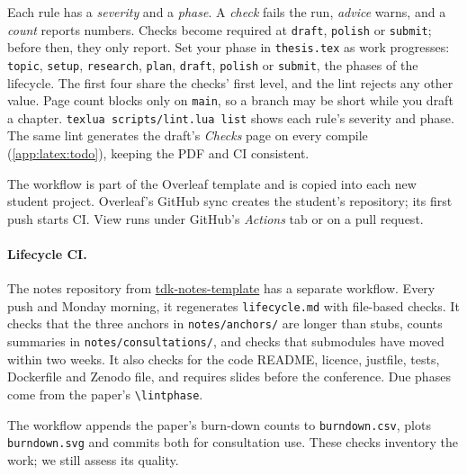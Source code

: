Each rule has a \emph{severity} and a \emph{phase}. A \emph{check} fails the run, \emph{advice} warns, and a \emph{count} reports numbers. Checks become required at \texttt{draft}, \texttt{polish} or \texttt{submit}; before then, they only report. Set your phase in \texttt{thesis.tex} as work progresses: \texttt{topic}, \texttt{setup}, \texttt{research}, \texttt{plan}, \texttt{draft}, \texttt{polish} or \texttt{submit}, the phases of the lifecycle. The first four share the checks' first level, and the lint rejects any other value. Page count blocks only on \texttt{main}, so a branch may be short while you draft a chapter. \texttt{texlua scripts/lint.lua list} shows each rule's severity and phase. The same lint generates the draft's \emph{Checks} page on every compile (\cref{app:latex:todo}), keeping the PDF and CI consistent.

The workflow is part of the Overleaf template and is copied into each new student project. Overleaf's GitHub sync creates the student's repository; its first push starts CI. View runs under GitHub's \emph{Actions} tab or on a pull request.
\paragraph{Lifecycle CI.} The notes repository from \href{https://github.com/BlackLight54/tdk-notes-template}{tdk-notes-template} has a separate workflow. Every push and Monday morning, it regenerates \texttt{lifecycle.md} with file-based checks. It checks that the three anchors in \texttt{notes/anchors/} are longer than stubs, counts summaries in \texttt{notes/consultations/}, and checks that submodules have moved within two weeks. It also checks for the code README, licence, justfile, tests, Dockerfile and Zenodo file, and requires slides before the conference. Due phases come from the paper's \texttt{\textbackslash lintphase}.

The workflow appends the paper's burn-down counts to \texttt{burndown.csv}, plots \texttt{burndown.svg} and commits both for consultation use. These checks inventory the work; we still assess its quality.

